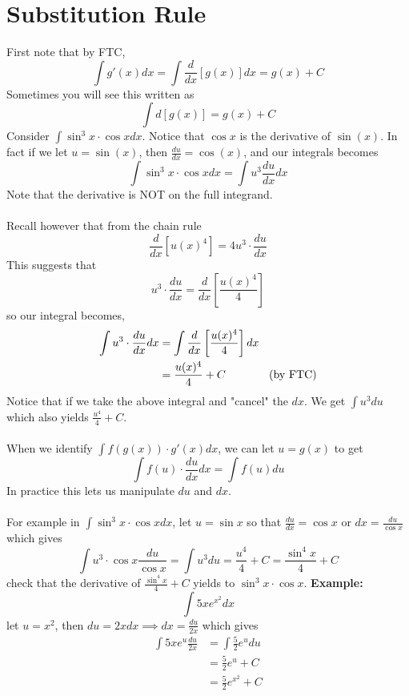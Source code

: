 \documentclass[11pt, a4paper]{memoir}
\theoremstyle{change}
\theoremstyle{plain}
\theoremstyle{nonumberplain}
\numberwithin{equation}{section}
\begin{document}
\section{Substitution Rule}
First note that by FTC, $$\int g'(x) dx = \int \frac{d}{dx}[g(x)] dx = g(x) + C$$
Sometimes you will see this written as $$\int d[g(x)] = g(x) + C$$
Consider $\int \sin^3x \cdot \cos x dx$. Notice that $\cos x$ is the derivative of $\sin(x)$. In fact if we let
$u = \sin(x)$, then $\frac{du}{dx} = \cos(x)$, and our integrals becomes $$\int \sin^3 x \cdot \cos x dx = \int u^3 \frac{du}{dx} dx$$
Note that the derivative is NOT on the full integrand. \\ \vspace{0.5ex} \\
Recall however that from the chain rule $$\frac{d}{dx}[u(x)^4] = 4u^3 \cdot \frac{du}{dx}$$
This suggests that $$u^3 \cdot \frac{du}{dx} = \frac{d}{dx}\left[\frac{u(x)^4}{4}\right]$$
so our integral becomes, 
\begin{align*}
  \int u^3 \cdot \frac{du}{dx} dx &= \int \frac{d}{dx}\left[\frac{u(x)^4}{4}\right] dx \\
                                  &= \frac{u(x)^4}{4} + C \hspace{9ex} \text{(by FTC)}
\end{align*}
Notice that if we take the above integral and "cancel" the $dx$. We get $\int u^3 du$ which also yields $\frac{u^4}{4} + C$.
\\ \vspace{0.5ex} \\
When we identify $\int f(g(x)) \cdot g'(x) dx$, we can let $u = g(x)$ to get $$\int f(u) \cdot \frac{du}{dx} dx = \int f(u) du$$
In practice this lets us manipulate $du$ and $dx$. \\ \vspace{0.5ex} \\
For example in $\int \sin^3x \cdot \cos x dx$, let $u = \sin x$ so that $\frac{du}{dx} = \cos x$ or $dx = \frac{du}{\cos x}$ which gives 
$$\int u^3 \cdot \cos x \frac{du}{\cos x} = \int u^3 du = \frac{u^4}{4} + C = \frac{\sin^4 x}{4} + C$$
check that the derivative of $\frac{\sin^4 x}{4} + C$ yields to $\sin^3x \cdot \cos x$.
\textbf{Example: } $$\int 5xe^{x^2} dx$$
let $u = x^2$, then $du = 2x dx \implies dx = \frac{du}{2x}$ which gives
\begin{align*}
  \int 5xe^u \frac{du}{2x} &= \int \frac{5}{2}e^u du \\ 
                          &= \frac{5}{2}e^u + C \\
                          &= \frac{5}{2}e^{x^2} + C
\end{align*}
\end{document}

